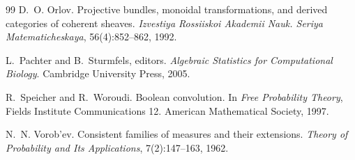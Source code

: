 \documentclass[11pt]{article}
\theoremstyle{definition}
\theoremstyle{remark}
\begin{document}
\begin{thebibliography}{99}
D.~O. Orlov.
\newblock Projective bundles, monoidal transformations, and derived categories of coherent sheaves.
\newblock \emph{Izvestiya Rossiiskoi Akademii Nauk. Seriya Matematicheskaya}, 56(4):852--862, 1992.

L.~Pachter and B.~Sturmfels, editors.
\newblock \emph{Algebraic Statistics for Computational Biology}.
\newblock Cambridge University Press, 2005.

R.~Speicher and R.~Woroudi.
\newblock Boolean convolution.
\newblock In \emph{Free Probability Theory}, Fields Institute Communications 12. American Mathematical
Society, 1997.

N.~N. Vorob'ev.
\newblock Consistent families of measures and their extensions.
\newblock \emph{Theory of Probability and Its Applications}, 7(2):147--163, 1962.

\end{thebibliography}
\end{document}
